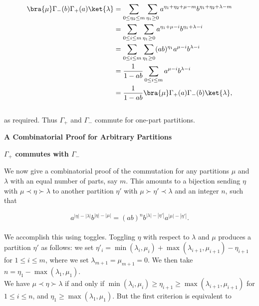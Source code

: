 \begin{align*}
	\bra{\mu} \Gamma_-(b) \Gamma_+(a) \ket{\lambda} &= \sum_{0 \leq \eta_2 \leq m} \sum_{\eta_1 \geq 0} a^{\eta_1 + \eta_2 + \mu - m} b^{\eta_1 + \eta_2 + \lambda - m}\\
	&= \sum_{0 \leq i \leq m} \sum_{\eta_1 \geq 0} a^{\eta_1 + \mu - i} b^{\eta_1 + \lambda - i}\\
	&= \sum_{0 \leq i \leq m} \sum_{\eta_1 \geq 0} (ab)^{\eta_1} a^{\mu - i} b^{\lambda - i}\\
	&= \frac{1}{1 - ab} \sum_{0 \leq i \leq m} a^{\mu - i} b^{\lambda - i}\\
	&= \frac{1}{1 - ab} \bra{\mu} \Gamma_+(a) \Gamma_-(b) \ket{\lambda},
\end{align*}
~\\
as required. Thus $\Gamma_+$ and $\Gamma_-$ commute for one-part partitions.

\vspace{.5in}

\Large \textbf{A Combinatorial Proof for Arbitrary Partitions}

\vspace{.25in}

\large \textbf{$\Gamma_+$ commutes with $\Gamma_-$}

\vspace{.25in}

\normalsize

We now give a combinatorial proof of the commutation for any partitions $\mu$ and $\lambda$ with an equal number of parts, say $m$. This amounts to a bijection sending $\eta$ with $\mu \prec \eta \succ \lambda$ to another partition $\eta'$ with $\mu \succ \eta' \prec \lambda$ and an integer $n$, such that

$$
	a^{|\eta| - |\lambda|} b^{|\eta| - |\mu|} = (ab)^n b^{|\lambda| - |\eta'|} a^{|\mu| - |\eta'|}.
$$
~\\
We accomplish this using toggles. Toggling $\eta$ with respect to $\lambda$ and $\mu$ produces a partition $\eta'$ as follows: we set $\eta'_i = \min(\lambda_i, \mu_i) + \max(\lambda_{i + 1}, \mu_{i + 1}) - \eta_{i + 1}$ for $1 \leq i \leq m$, where we set $\lambda_{m + 1} = \mu_{m + 1} = 0$. We then take $n = \eta_1 - \max(\lambda_1, \mu_1)$.\\

We have $\mu \prec \eta \succ \lambda$ if and only if $\min(\lambda_i, \mu_i) \geq \eta_{i + 1} \geq \max(\lambda_{i + 1}, \mu_{i + 1})$ for $1 \leq i \leq n$, and $\eta_1 \geq \max(\lambda_1, \mu_1)$. But the first criterion is equivalent to


